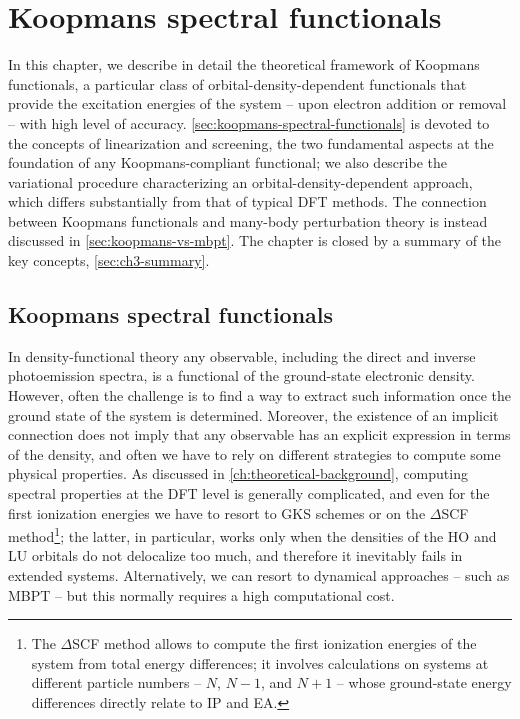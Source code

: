 \cleardoublepage
\chapter{Koopmans spectral functionals\label{ch:koopmans-theory}}

In this chapter, we describe in detail the theoretical framework of Koopmans functionals, a particular class of orbital-density-dependent functionals that provide the excitation energies of the system -- upon electron addition or removal -- with high level of accuracy. \cref{sec:koopmans-spectral-functionals} is devoted to the concepts of linearization and screening, the two fundamental aspects at the foundation of any Koopmans-compliant functional; we also describe the variational procedure characterizing an orbital-density-dependent approach, which differs substantially from that of typical DFT methods. The connection between Koopmans functionals and many-body perturbation theory is instead discussed in \cref{sec:koopmans-vs-mbpt}. The chapter is closed by a summary of the key concepts, \cref{sec:ch3-summary}.

\clearpage
\section{Koopmans spectral functionals\label{sec:koopmans-spectral-functionals}}
In density-functional theory any observable, including the direct and inverse photoemission spectra, is a functional of the ground-state electronic density. However, often the challenge is to find a way to extract such information once the ground state of the system is determined. Moreover, the existence of an implicit connection does not imply that any observable has an explicit expression in terms of the density, and often we have to rely on different strategies to compute some physical properties. As discussed in \cref{ch:theoretical-background}, computing spectral properties at the DFT level is generally complicated, and even for the first ionization energies we have to resort to GKS schemes or on the $\Delta$SCF method\footnote{The $\Delta$SCF method allows to compute the first ionization energies of the system from total energy differences; it involves calculations on systems at different particle numbers -- $N$, $N-1$, and $N+1$ -- whose ground-state energy differences directly relate to IP and EA.}; the latter, in particular, works only when the densities of the HO and LU orbitals do not delocalize too much, and therefore it inevitably fails in extended systems. Alternatively, we can resort to dynamical approaches -- such as MBPT -- but this normally requires a high computational cost.

